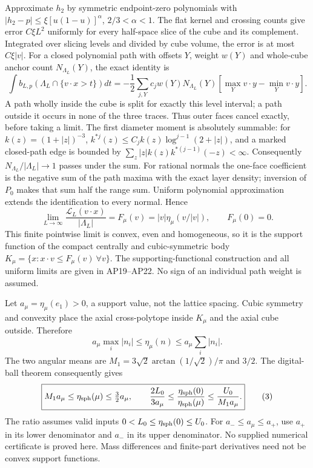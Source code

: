\documentclass[10pt]{article}
\begin{document}
Approximate $h_2$ by symmetric endpoint-zero polynomials with
$|h_2-p|\leq\xi[u(1-u)]^\alpha$, $2/3<\alpha<1$.
The flat kernel and crossing counts give error $C\xi L^2$ uniformly
for every half-space slice of the cube and its complement. Integrated
over slicing levels and divided by cube volume, the error is at most
$C\xi|v|$. For a closed polynomial path with offsets $Y$, weight
$w(Y)$ and whole-cube anchor count $N_{\Lambda_L}(Y)$, the exact identity is
\[
 \int b_{L,p}(\Lambda_L\cap\{v\cdot x>t\})dt
 =-\frac12\sum_{j,Y}c_jw(Y)N_{\Lambda_L}(Y)
            [\max_Y v\cdot y-\min_Y v\cdot y].
\]
A path wholly inside the cube is split for exactly this level interval;
a path outside it occurs in none of the three traces. Thus outer faces
cancel exactly, before taking a limit. The first diameter moment is
absolutely summable: for $k(z)=(1+|z|)^{-3}$,
$k^{*j}(z)\leq C_jk(z)\log^{j-1}(2+|z|)$, and a marked closed-path
edge is bounded by $\sum_z|z|k(z)k^{*(j-1)}(-z)<\infty$.
Consequently $N_{\Lambda_L}/|\Lambda_L|\to1$ passes under the sum.
For rational normals the one-face coefficient is the negative sum of
the path maxima with the exact layer density; inversion of $P_0$
makes that sum half the range sum. Uniform polynomial approximation
extends the identification to every normal. Hence
\[
 \lim_{L\to\infty}\frac{\mathcal L_L(v\cdot x)}{|\Lambda_L|}
 =F_\mu(v)=|v|\eta_\mu(v/|v|),\qquad F_\mu(0)=0.
\]
This finite pointwise limit is convex, even and homogeneous, so it is
the support function of the compact centrally and cubic-symmetric body
$K_\mu=\{x:x\cdot v\leq F_\mu(v)\ \forall v\}$.
The supporting-functional construction and all uniform limits are given
in AP19--AP22. No sign of an individual path weight is assumed.

Let $a_\mu=\eta_\mu(e_1)>0$, a support value, not the lattice spacing.
Cubic symmetry and convexity place the axial cross-polytope inside
$K_\mu$ and the axial cube outside. Therefore
\[
 a_\mu\max_i|n_i|\leq\eta_\mu(n)\leq a_\mu\sum_i|n_i|.
\]
The two angular means are
$M_1=3\sqrt2\arctan(1/\sqrt2)/\pi$ and $3/2$.
The digital-ball theorem consequently gives
\begin{equation}
 \boxed{\displaystyle
 M_1a_\mu\leq\eta_{\rm sph}(\mu)\leq\tfrac32a_\mu,\qquad
 \frac{2L_0}{3a_\mu}\leq
 \frac{\eta_{\rm sph}(0)}{\eta_{\rm sph}(\mu)}
 \leq\frac{U_0}{M_1a_\mu}.}                         \tag{3}
\end{equation}
The ratio assumes valid inputs $0<L_0\leq\eta_{\rm sph}(0)\leq U_0$.
For $a_-\leq a_\mu\leq a_+$, use $a_+$ in its lower denominator
and $a_-$ in its upper denominator. No supplied numerical certificate
is proved here. Mass differences and finite-part derivatives need not
be convex support functions.
\end{document}
